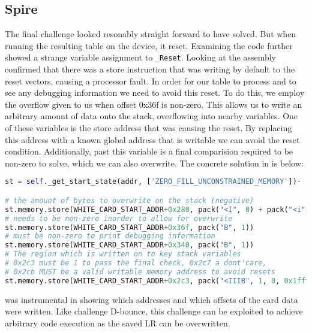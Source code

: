 \subsection{Spire}
The final challenge looked resonably straight forward to have \angr solved.
But when running the resulting table on the device, it reset. Examining the code further showed a strange variable assignment to \texttt{\_Reset}. Looking at the assembly confirmed that there was a store instruction that was writing by default to the reset vectors, causing a processor fault. In order for our table to process and to see any debugging information we need to avoid this reset. To do this, we employ the overflow given to us when offset 0x36f is non-zero. This allows us to write an arbitrary amount of data onto the stack, overflowing into nearby variables. One of these variables is the store address that was causing the reset. By replacing this address with a known global address that is writable we can avoid the reset condition. Additionally, past this variable is a final comparision required to be non-zero to solve, which we can also overwrite.
The concrete solution in \angr is below:

\begin{lstlisting}[language=python]
st = self._get_start_state(addr, ['ZERO_FILL_UNCONSTRAINED_MEMORY'])⋅

# the amount of bytes to overwrite on the stack (negative)
st.memory.store(WHITE_CARD_START_ADDR+0x280, pack("<I", 0) + pack("<i", -(4*3)))
# needs to be non-zero inorder to allow for overwrite
st.memory.store(WHITE_CARD_START_ADDR+0x36f, pack("B", 1))
# must be non-zero to print debugging information
st.memory.store(WHITE_CARD_START_ADDR+0x340, pack("B", 1))
# The region which is written on to key stack variables
# 0x2c3 must be 1 to pass the final check, 0x2c7 a dont'care,
# 0x2cb MUST be a valid writable memory address to avoid resets
st.memory.store(WHITE_CARD_START_ADDR+0x2c3, pack("<IIIB", 1, 0, 0x1fffa140, 0))
\end{lstlisting}

\noindent \angr was instrumental in showing which addresses and which offsets of the card data were written. Like challenge D-bounce, this challenge can be exploited to achieve arbitrary code execution as the saved LR can be overwritten.
